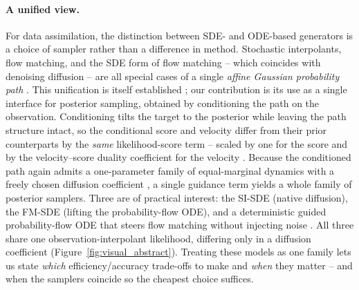 \paragraph{A unified view.}
For data assimilation, the distinction between SDE- and ODE-based generators is a choice of sampler rather than a difference in method. Stochastic interpolants, flow matching, and the SDE form of flow matching -- which coincides with denoising diffusion -- are all special cases of a single \emph{affine Gaussian probability path} \cite{albergo_stochastic_2023, lipman_flow_2023, ma_sit_2024, holderrieth_generator_2024}. This unification is itself established \cite{albergo_stochastic_2023, holderrieth_generator_2024}; our contribution is its use as a single interface for posterior sampling, obtained by conditioning the path on the observation. Conditioning tilts the target to the posterior while leaving the path structure intact, so the conditional score and velocity differ from their prior counterparts by the \emph{same} likelihood-score term -- scaled by one for the score and by the velocity--score duality coefficient for the velocity \cite{albergo_stochastic_2023, ma_sit_2024}. Because the conditioned path again admits a one-parameter family of equal-marginal dynamics with a freely chosen diffusion coefficient \cite{song_score-based_2021}, a single guidance term yields a whole family of posterior samplers. Three are of practical interest: the SI-SDE (native diffusion), the FM-SDE (lifting the probability-flow ODE), and a deterministic guided probability-flow ODE that steers flow matching without injecting noise \cite{yan_fig_2024, pokle_training-free_2024}. All three share one observation-interpolant likelihood, differing only in a diffusion coefficient (Figure~\ref{fig:visual_abstract}). Treating these models as one family lets us state \emph{which} efficiency/accuracy trade-offs to make and \emph{when} they matter -- and when the samplers coincide so the cheapest choice suffices.



